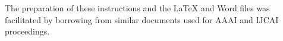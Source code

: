 \documentclass[letterpaper]{article}
\begin{document}
The preparation of these instructions and the \LaTeX{} and Word files was 
facilitated by borrowing from similar documents used for AAAI and IJCAI proceedings.








\end{document}
